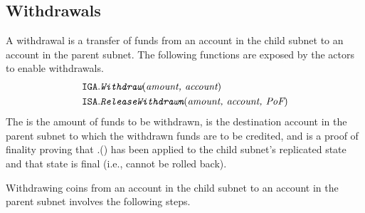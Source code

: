 \subsection{Withdrawals}
\label{sec:withdraw}

A withdrawal is a transfer of funds from an account in the child subnet to an account in the parent subnet.
The following functions are exposed by the \ipc actors to enable withdrawals.
\begin{align*}
    \texttt{IGA}.&\textit{\texttt{Withdraw}}(\textit{amount, account})\\
    \texttt{ISA}.&\textit{\texttt{ReleaseWithdrawn}}(\textit{amount, account, \textit{PoF}})
\end{align*}
The  is the amount of funds to be withdrawn,  is the destination account in the parent subnet to which the withdrawn funds are to be credited, and \funcParam{\pof} is a proof of finality proving that \gw.() has been applied to the child subnet's replicated state and that state is final (i.e., cannot be rolled back).

Withdrawing  coins from an account  in the child subnet  to an account  in the parent subnet 
involves the following steps.

